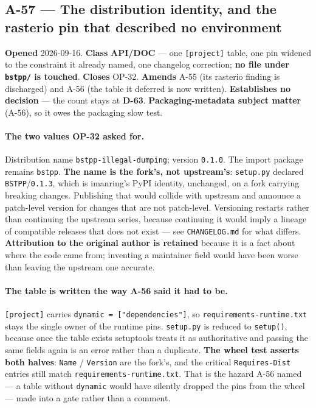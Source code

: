 \documentclass[
  10pt,
]{article}
\begin{document}
\hypertarget{a-57}{%
\subsection{A-57 --- The distribution identity, and the rasterio pin that
described no environment}\label{a-57}}

\textbf{Opened} 2026-09-16. \textbf{Class} \textbf{API/DOC} --- one
\texttt{[project]} table, one pin widened to the constraint it already named,
one changelog correction; \textbf{no file under \texttt{bstpp/} is touched}.
\textbf{Closes} OP-32. \textbf{Amends} A-55 (its rasterio finding is discharged)
and A-56 (the table it deferred is now written). \textbf{Establishes no
decision} --- the count stays at \textbf{D-63}. \textbf{Packaging-metadata
subject matter} (A-56), so it owes the packaging slow test.

\paragraph{The two values OP-32 asked for.}
Distribution name \texttt{bstpp-illegal-dumping}; version \texttt{0.1.0}. The
import package remains \texttt{bstpp}. \textbf{The name is the fork's, not
upstream's}: \texttt{setup.py} declared \texttt{BSTPP}/\texttt{0.1.3}, which is
imanring's PyPI identity, unchanged, on a fork carrying breaking changes.
Publishing that would collide with upstream and announce a patch-level version
for changes that are not patch-level. Versioning restarts rather than continuing
the upstream series, because continuing it would imply a lineage of compatible
releases that does not exist --- see \texttt{CHANGELOG.md} for what differs.
\textbf{Attribution to the original author is retained} because it is a fact
about where the code came from; inventing a maintainer field would have been
worse than leaving the upstream one accurate.

\paragraph{The table is written the way A-56 said it had to be.}
\texttt{[project]} carries \texttt{dynamic = ["dependencies"]}, so
\texttt{requirements-runtime.txt} stays the single owner of the runtime pins.
\texttt{setup.py} is reduced to \texttt{setup()}, because once the table exists
setuptools treats it as authoritative and passing the same fields again is an
error rather than a duplicate. \textbf{The wheel test asserts both halves}:
\texttt{Name} / \texttt{Version} are the fork's, and the critical
\texttt{Requires-Dist} entries still match \texttt{requirements-runtime.txt}.
That is the hazard A-56 named --- a table without \texttt{dynamic} would have
silently dropped the pins from the wheel --- made into a gate rather than a
comment.
\end{document}
